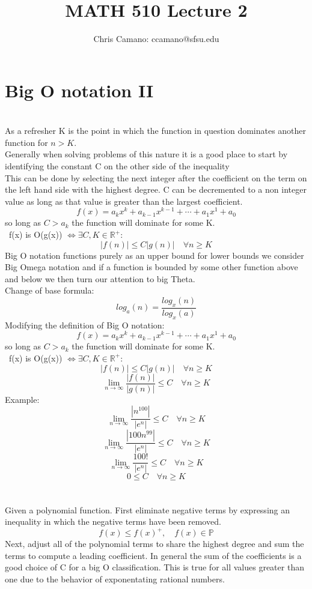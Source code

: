 \documentclass[12pt]{article}
\author{Chris Camano: ccamano@sfsu.edu}
\title{MATH 510  Lecture 2 }
\date
\newcommand{\sect}[1]{\section*{#1}}
\newcommand{\R}{\mathbb{R}}
\newcommand{\arr}{\rightarrow}
\theoremstyle{definition}
\theoremstyle{remark}
\numberwithin{equation}{section}
\begin{document}
\maketitle


\sect{Big O notation II}\\
As a refresher K is the point in which the function in question dominates another function for $n>K$.\\
Generally when solving problems of this nature it is a good place to start by identifying the constant C on the other side of the inequality\\
This can be done by selecting the next integer after the coefficient on the term on the left hand side with the highest degree. C can be decremented to a non integer value as long as that value is greater than the largest coefficient.
\[
f(x)=  a_kx^k+a_{k-1}x^{k-1}+\cdots+a_1x^1+a_0
\]
so long as $C>a_k$ the function will dominate for some K.\\\
f(x) is O(g(x)) $\iff$$\exists C,K\in \R^+:$
\[
  |f(n)|\leq C|g(n)|\quad \forall n\geq K
\]
Big O notation functions purely as an upper bound for lower bounds we consider Big Omega notation and if a function is bounded by some other function above and below we then turn our attention to big Theta. \\
\defn Change of base formula:
\[
  log_a(n)=\frac{log_x(n)}{log_x(a)}
\]
\prop Modifying the definition of Big O notation:
\[
f(x)=  a_kx^k+a_{k-1}x^{k-1}+\cdots+a_1x^1+a_0
\]
so long as $C>a_k$ the function will dominate for some K.\\\
f(x) is O(g(x)) $\iff$$\exists C,K\in \R^+:$
\[
  |f(n)|\leq C|g(n)|\quad \forall n\geq K
\]
\[
  \lim_{n\arr\infty}\frac{|f(n)|}{|g(n)|}\leq C\quad \forall n\geq K
\]
Example:
\[
  \lim_{n\arr\infty}\frac{|n^{100}|}{|e^n|}\leq C\quad \forall n\geq K
\]
\[
  \lim_{n\arr\infty}\frac{|100n^{99}|}{|e^n|}\leq C\quad \forall n\geq K
\]
\[
  \lim_{n\arr\infty}\frac{100!}{|e^n|}\leq C\quad \forall n\geq K
\]
\[
0\leq C\quad \forall n\geq K
\]\\\\
Given a polynomial function. First eliminate negative terms by expressing an inequality in which the negative terms have been removed.
\[
  f(x)\leq f(x)^+ ,\quad f(x) \in \mathbb{P}
\]
Next, adjust all of the polynomial terms to share the highest degree and sum the terms to compute a leading coefficient. In general the sum of the coefficients is a good choice of C for a big O classification. This is true for all values greater than one due to the behavior of exponentating rational numbers.
\end{document}
